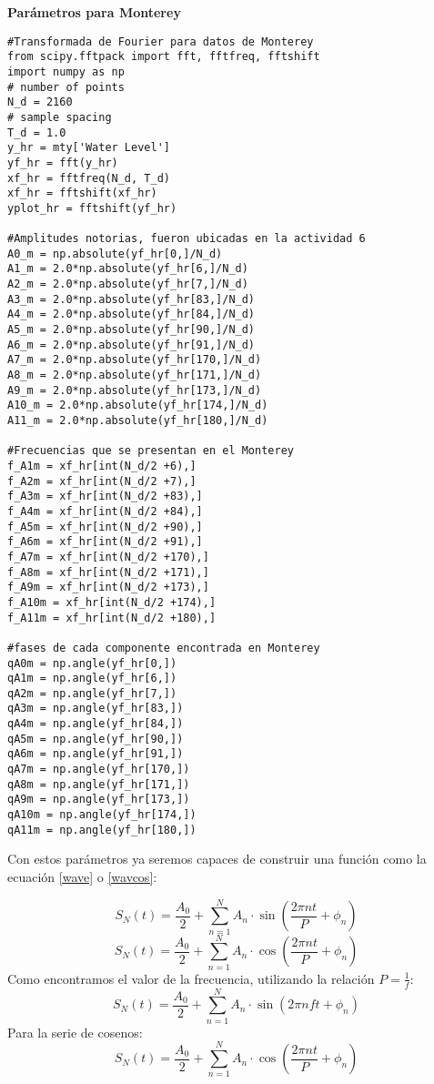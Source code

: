 \textbf{Parámetros para Monterey}
\begin{verbatim}
#Transformada de Fourier para datos de Monterey
from scipy.fftpack import fft, fftfreq, fftshift
import numpy as np
# number of points
N_d = 2160
# sample spacing
T_d = 1.0
y_hr = mty['Water Level']
yf_hr = fft(y_hr)
xf_hr = fftfreq(N_d, T_d)
xf_hr = fftshift(xf_hr)
yplot_hr = fftshift(yf_hr)

#Amplitudes notorias, fueron ubicadas en la actividad 6
A0_m = np.absolute(yf_hr[0,]/N_d)
A1_m = 2.0*np.absolute(yf_hr[6,]/N_d)
A2_m = 2.0*np.absolute(yf_hr[7,]/N_d)
A3_m = 2.0*np.absolute(yf_hr[83,]/N_d)
A4_m = 2.0*np.absolute(yf_hr[84,]/N_d)
A5_m = 2.0*np.absolute(yf_hr[90,]/N_d)
A6_m = 2.0*np.absolute(yf_hr[91,]/N_d)
A7_m = 2.0*np.absolute(yf_hr[170,]/N_d)
A8_m = 2.0*np.absolute(yf_hr[171,]/N_d)
A9_m = 2.0*np.absolute(yf_hr[173,]/N_d)
A10_m = 2.0*np.absolute(yf_hr[174,]/N_d)
A11_m = 2.0*np.absolute(yf_hr[180,]/N_d)

#Frecuencias que se presentan en el Monterey
f_A1m = xf_hr[int(N_d/2 +6),]
f_A2m = xf_hr[int(N_d/2 +7),]
f_A3m = xf_hr[int(N_d/2 +83),]
f_A4m = xf_hr[int(N_d/2 +84),]
f_A5m = xf_hr[int(N_d/2 +90),]
f_A6m = xf_hr[int(N_d/2 +91),]
f_A7m = xf_hr[int(N_d/2 +170),]
f_A8m = xf_hr[int(N_d/2 +171),]
f_A9m = xf_hr[int(N_d/2 +173),]
f_A10m = xf_hr[int(N_d/2 +174),]
f_A11m = xf_hr[int(N_d/2 +180),]

#fases de cada componente encontrada en Monterey
qA0m = np.angle(yf_hr[0,])
qA1m = np.angle(yf_hr[6,])
qA2m = np.angle(yf_hr[7,])
qA3m = np.angle(yf_hr[83,])
qA4m = np.angle(yf_hr[84,])
qA5m = np.angle(yf_hr[90,])
qA6m = np.angle(yf_hr[91,])
qA7m = np.angle(yf_hr[170,])
qA8m = np.angle(yf_hr[171,])
qA9m = np.angle(yf_hr[173,])
qA10m = np.angle(yf_hr[174,])
qA11m = np.angle(yf_hr[180,])
\end{verbatim}

Con estos parámetros ya seremos capaces de construir una función como la ecuación \ref{wave} o \ref{wavcos}:

$$S_N(t) = \frac{A_0}{2} + \sum_{n=1}^{N} A_n\cdot\sin{(\frac{2\pi n t}{P}+ \phi_n)}$$
$$S_N(t) = \frac{A_0}{2} + \sum_{n=1}^{N} A_n\cdot\cos{(\frac{2\pi n t}{P}+ \phi_n)}$$
Como encontramos el valor de la frecuencia, utilizando la relación $P=\frac{1}{f}$:
\begin{equation}
S_N(t) = \frac{A_0}{2} + \sum_{n=1}^{N} A_n\cdot\sin{(2\pi n f t + \phi_n)}
\label{wavf}
\end{equation}
Para la serie de cosenos:
\begin{equation}
S_N(t) = \frac{A_0}{2} + \sum_{n=1}^{N} A_n\cdot\cos{(\frac{2\pi n t}{P}+ \phi_n)}
\end{equation}
